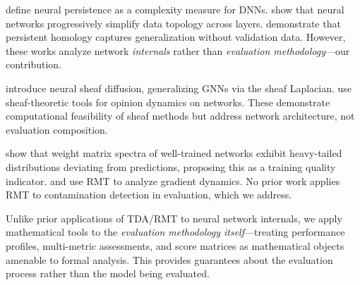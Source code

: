 \citet{ramamurthy2019topological} define neural persistence as a complexity measure for DNNs.
\citet{naitzat2020topology} show that neural networks progressively simplify data topology across layers.
\citet{rieck2019neural} demonstrate that persistent homology captures generalization without validation data.
However, these works analyze network \emph{internals} rather than \emph{evaluation methodology}---our contribution.

\citet{bodnar2022neural} introduce neural sheaf diffusion, generalizing GNNs via the sheaf Laplacian.
\citet{hansen2020sheaf} use sheaf-theoretic tools for opinion dynamics on networks.
These demonstrate computational feasibility of sheaf methods but address network architecture, not evaluation composition.

\citet{martin2021implicit} show that weight matrix spectra of well-trained networks exhibit heavy-tailed distributions deviating from \marchpast predictions, proposing this as a training quality indicator.
\citet{wei2022deep} and \citet{pennington2017resurrecting} use RMT to analyze gradient dynamics.
No prior work applies RMT to contamination detection in evaluation, which we address.

Unlike prior applications of TDA/RMT to neural network internals, we apply mathematical tools to the \emph{evaluation methodology itself}---treating performance profiles, multi-metric assessments, and score matrices as mathematical objects amenable to formal analysis.
This provides guarantees about the evaluation process rather than the model being evaluated.
